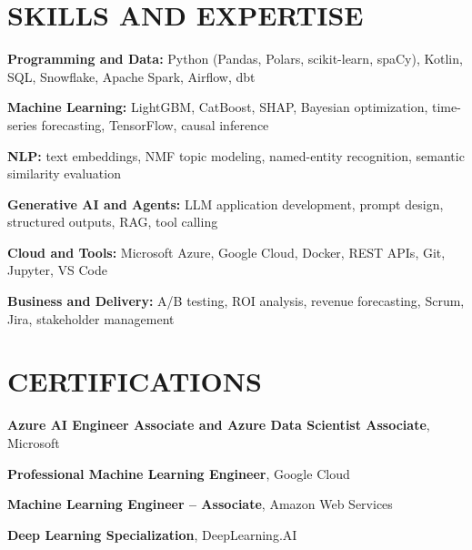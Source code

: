     \section{SKILLS AND EXPERTISE}
    \begin{onecolentry}
        \textbf{Programming and Data:} Python (Pandas, Polars, scikit-learn, spaCy), Kotlin, SQL, Snowflake, Apache Spark, Airflow, dbt
    \end{onecolentry}
    \vspace{0.05 cm}
    \begin{onecolentry}
        \textbf{Machine Learning:} LightGBM, CatBoost, SHAP, Bayesian optimization, time-series forecasting, TensorFlow, causal inference
    \end{onecolentry}
    \vspace{0.05 cm}
    \begin{onecolentry}
        \textbf{NLP:} text embeddings, NMF topic modeling, named-entity recognition, semantic similarity evaluation
    \end{onecolentry}
    \vspace{0.05 cm}
    \begin{onecolentry}
        \textbf{Generative AI and Agents:} LLM application development, prompt design, structured outputs, RAG, tool calling
    \end{onecolentry}
    \vspace{0.05 cm}
    \begin{onecolentry}
        \textbf{Cloud and Tools:} Microsoft Azure, Google Cloud, Docker, REST APIs, Git, Jupyter, VS Code
    \end{onecolentry}
    \vspace{0.05 cm}
    \begin{onecolentry}
        \textbf{Business and Delivery:} A/B testing, ROI analysis, revenue forecasting, Scrum, Jira, stakeholder management
    \end{onecolentry}

    \section{CERTIFICATIONS}
    \begin{highlights}
        \item \textbf{Azure AI Engineer Associate and Azure Data Scientist Associate}, Microsoft
        \item \textbf{Professional Machine Learning Engineer}, Google Cloud
        \item \textbf{Machine Learning Engineer -- Associate}, Amazon Web Services
        \item \textbf{Deep Learning Specialization}, DeepLearning.AI
    \end{highlights}

